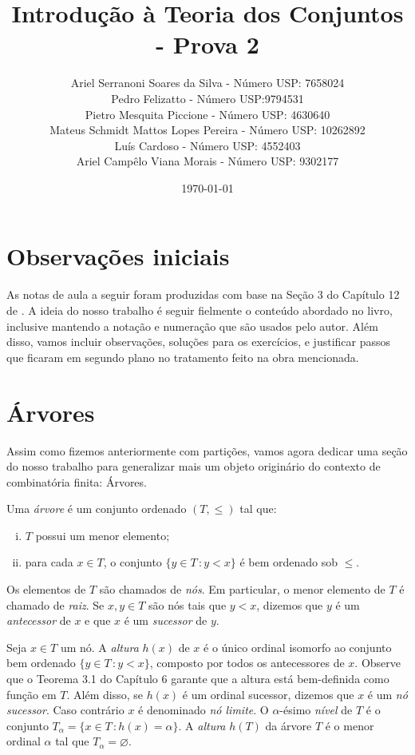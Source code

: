 \documentclass[a4paper]{article}
\title{Introdução à Teoria dos Conjuntos - Prova 2}
\author{Ariel Serranoni Soares da Silva  - Número USP: 7658024\\
Pedro Felizatto - Número USP:9794531\\
Pietro Mesquita Piccione - Número USP: 4630640\\
Mateus Schmidt Mattos Lopes Pereira - Número USP: 10262892\\
Luís Cardoso - Número USP: 4552403\\
Ariel Campêlo Viana Morais - Número USP: 9302177}
\date{\today}
\begin{document}
\maketitle
\section*{Observações iniciais}

As notas de aula a seguir foram produzidas com base na Seção 3 do Capítulo 12 de
\cite{jech}. A ideia do nosso trabalho é seguir fielmente o conteúdo abordado no
livro, inclusive mantendo a notação e numeração que são usados pelo autor.
Além disso, vamos incluir observações, soluções para os exercícios, e justificar
passos que ficaram em segundo plano no tratamento feito na obra mencionada.

\setcounter{section}{2}
\section{Árvores}

Assim como fizemos anteriormente com partições, vamos agora dedicar uma seção do
nosso trabalho para generalizar mais um objeto originário do
contexto de combinatória finita: Árvores.

\begin{definition}
  Uma \emph{árvore} é um conjunto ordenado \((T,\leq)\) tal que:
 \begin{enumerate}[(i)]
  \item \(T\) possui um menor elemento;
  \item para cada \(x\in T\), o conjunto \(\{y\in T\,\colon y<x\}\) é bem
    ordenado sob \(\leq\).
  \end{enumerate}
\end{definition}
Os elementos de \(T\) são chamados de \emph{nós}. Em particular,
o menor elemento de \(T\) é chamado  de \emph{raiz}.
Se \(x,y\in T\) são nós tais que  \(y<x\), dizemos que \(y\) é um
\emph{antecessor} de \(x\) e que \(x\) é um \emph{sucessor} de \(y\).

Seja \(x\in T\) um nó.  A \emph{altura} \(h(x)\) de \(x\) é o único ordinal
isomorfo ao conjunto bem ordenado \mbox{\(\{y\in T\,\colon
y<x\}\),} composto por todos os antecessores de \(x\). Observe que o Teorema 3.1
do Capítulo 6 garante que a altura está bem-definida como função em \(T\).
Além disso, se \(h(x)\) é um ordinal sucessor, dizemos que \(x\) é um
\emph{nó sucessor}. Caso contrário \(x\) é denominado \emph{nó limite}.
O \(\alpha\)-ésimo \emph{nível} de \(T\) é o conjunto
\(T_\alpha=\{x\in T \,\colon h(x)=\alpha\}\). A \emph{altura} \(h(T)\) da árvore
\(T\) é o menor ordinal \(\alpha\) tal que \(T_\alpha=\varnothing\).  
\end{document}
